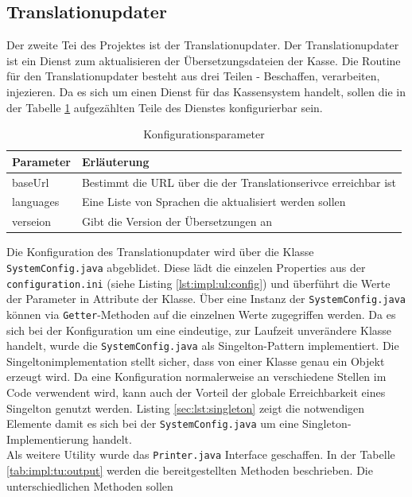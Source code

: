 \documentclass[10pt, oneside]{article}
\begin{document}
  \subsection{Translationupdater}
    Der zweite Tei des Projektes ist der Translationupdater. Der Translationupdater ist ein Dienst zum aktualisieren der Übersetzungsdateien der Kasse. 
    Die Routine für den Translationupdater besteht aus drei Teilen - Beschaffen, verarbeiten, injezieren.
    Da es sich um einen Dienst für das Kassensystem handelt, sollen die in der Tabelle \ref{tab:impl:tu:config} aufgezählten Teile des Dienstes konfigurierbar sein.
    \begin{table}
      \centering
      \begin{tabular}{l l}
        \hline
        \rowcolor{carolinablue}
        Parameter & Erläuterung \\
        \hline
        baseUrl & Bestimmt die URL über die der Translationserivce erreichbar ist\\
        \rowcolor{lightgray}
        languages & Eine Liste von Sprachen die aktualisiert werden sollen\\
        verseion & Gibt die Version der Übersetzungen an
      \end{tabular}
      \caption{Konfigurationsparameter}
      \label{tab:impl:tu:config}
    \end{table} 
    Die Konfiguration des Translationupdater wird über die Klasse \lstinline{SystemConfig.java} abgeblidet. Diese lädt die einzelen Properties aus der 
    \lstinline{configuration.ini} (siehe Listing \ref{lst:impl:ul:config}) und überführt die Werte der Parameter in Attribute der Klasse. Über eine Instanz
    der \lstinline{SystemConfig.java} können via \lstinline{Getter}-Methoden auf die einzelnen Werte zugegriffen werden. Da es sich bei der Konfiguration um eine 
    eindeutige, zur Laufzeit unverändere Klasse handelt, wurde die \lstinline{SystemConfig.java} als Singelton-Pattern implementiert. Die Singeltonimplementation stellt sicher, dass 
    von einer Klasse genau ein Objekt erzeugt wird. Da eine Konfiguration normalerweise an verschiedene Stellen im Code verwendent wird, kann auch der Vorteil der globale Erreichbarkeit 
    eines Singelton genutzt werden. Listing \ref{sec:lst:singleton} zeigt die notwendigen Elemente damit es sich bei der \lstinline{SystemConfig.java} um eine Singleton-Implementierung handelt.\\
    Als weitere Utility wurde das \lstinline{Printer.java} Interface geschaffen. In der Tabelle \ref{tab:impl:tu:output} werden die bereitgestellten Methoden beschrieben. Die unterschiedlichen Methoden sollen
\end{document}
